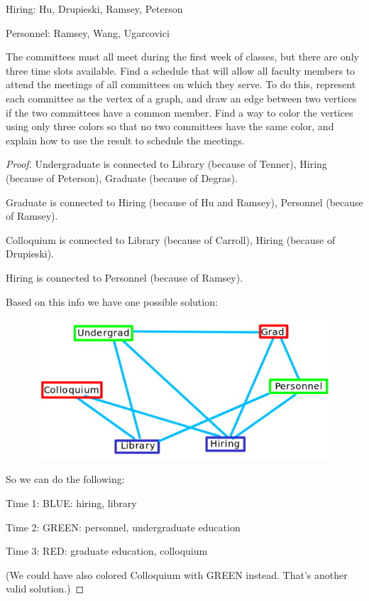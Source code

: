 \documentclass[14pt]{extarticle}
\begin{document}
Hiring: Hu, Drupieski, Ramsey, Peterson

Personnel: Ramsey, Wang, Ugarcovici

The committees must all meet during the first week of classes, but there are
only three time slots available. Find a schedule that will allow all faculty
members to attend the meetings of all committees on which they serve. To do
this, represent each committee as the vertex of a graph, and draw an edge
between two vertices if the two committees have a common member. Find a way to
color the vertices using only three colors so that no two committees have the
same color, and explain how to use the result to schedule the meetings.

\begin{proof}
Undergraduate is connected to Library (because of Tenner), Hiring (because of
Peterson), Graduate (because of Degras).

Graduate is connected to Hiring (because of Hu and Ramsey), Personnel (because
of Ramsey).

Colloquium is connected to Library (because of Carroll), Hiring (because of
Drupieski).

Hiring is connected to Personnel (because of Ramsey).

Based on this info we have one possible solution:
\begin{figure}[ht!]
\centering
\includegraphics[scale=0.5]{../images/1.4.16.sol.png}
\end{figure}

So we can do the following:

Time 1: BLUE: hiring, library

Time 2: GREEN: personnel, undergraduate education

Time 3: RED: graduate education, colloquium

(We could have also colored Colloquium with GREEN instead. That's another
valid solution.)
\end{proof}
\end{document}
